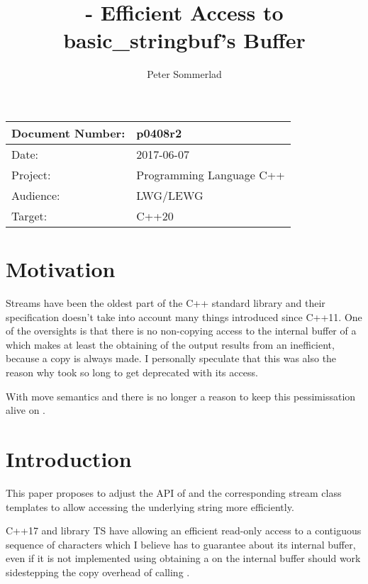 \documentclass[ebook,11pt,article]{memoir}
\title{\papernumber{} - Efficient Access to basic\_stringbuf's Buffer}
\author{Peter Sommerlad}
\date{\paperdate}                        %
\newcommand{\papernumber}{p0408r2}
\newcommand{\paperdate}{2017-06-07}
\begin{document}
\maketitle
\begin{tabular}[t]{|l|l|}\hline 
Document Number: & \papernumber  \\\hline
Date: & \paperdate \\\hline
Project: & Programming Language C++\\\hline 
Audience: & LWG/LEWG\\\hline
Target: & C++20\\\hline
\end{tabular}

\chapter{Motivation}
Streams have been the oldest part of the C++ standard library and their specification doesn't take into account many things introduced since C++11. One of  the oversights is that there is no non-copying access to the internal buffer of a  which makes at least the obtaining of the output results from an  inefficient, because a copy is always made. I personally speculate that this was also the reason why  took so long to get deprecated with its  access.

With move semantics and  there is no longer a reason to keep this pessimissation alive on .


\chapter{Introduction}
This paper proposes to adjust the API of  and the corresponding stream class templates to allow accessing the underlying string more efficiently.

C++17 and library TS have  allowing an efficient read-only access to a contiguous sequence of characters which I believe  has to guarantee about its internal buffer, even if it is not implemented using  obtaining a  on the internal buffer should work sidestepping the copy overhead of calling . 
\end{document}
